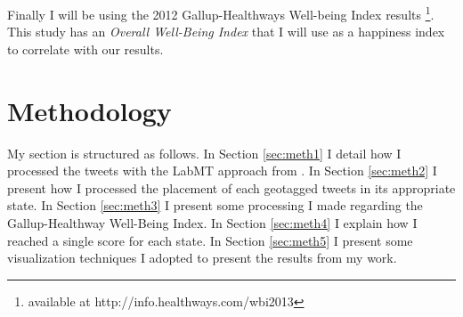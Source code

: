 \documentclass{llncs}
\begin{document}
Finally I will be using the 2012 Gallup-Healthways Well-being Index results \cite{GallupHealthway2013} \footnote{available at http://info.healthways.com/wbi2013}. This study has an \emph{Overall Well-Being Index} that I will use as a happiness index to correlate with our results.

\section{Methodology}
\label{sec:meth}
My section is structured as follows. In Section \ref{sec:meth1} I detail how I processed the tweets with the LabMT approach from \cite{Dodds2011}. In Section \ref{sec:meth2} I present how I processed the placement of each geotagged tweets in its appropriate state. In Section \ref{sec:meth3} I present some processing I made regarding the Gallup-Healthway Well-Being Index. In Section \ref{sec:meth4} I explain how I reached a single score for each state. In Section \ref{sec:meth5} I present some visualization techniques I adopted to present the results from my work.
\end{document}
